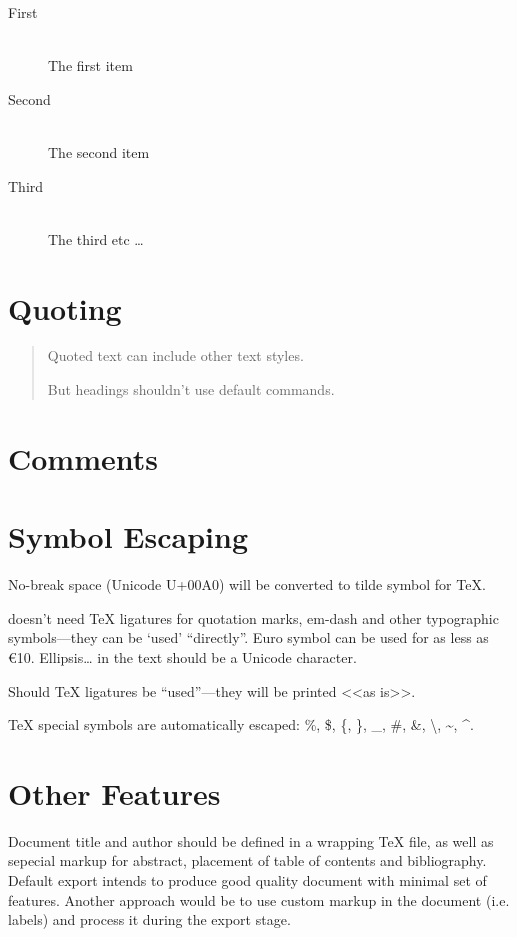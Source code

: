 \documentclass[10pt]{article}
\begin{document}
\begin{description}
  \item[First] \hfill \\
  The first item
  \item[Second] \hfill \\
  The second item
  \item[Third] \hfill \\
  The third etc \ldots
\end{description}

\section{Quoting}

\begin{quotation}

Quoted text can include other text styles.

\Large But headings shouldn’t use default commands.

\end{quotation}

\section{Comments}

\section{Symbol Escaping}

No-break space (Unicode U+00A0) will be converted to tilde symbol for TeX.

\XeTeX{} doesn't need \TeX{} ligatures for quotation marks, em-dash and other
typographic symbols—they can be ‘used’ “directly”. Euro symbol can be used for
as less as €10. Ellipsis… in the text should be a Unicode character.

Should \TeX{} ligatures be ``used''—they will be printed <<as is>>.

\TeX{} special symbols are automatically escaped: \%, \$, \{, \}, \_, \#,
\&, \textbackslash, \textasciitilde, \textasciicircum.

\section{Other Features}

Document title and author should be defined in a wrapping \TeX{} file, as well
as sepecial markup for abstract, placement of table of contents and
bibliography. Default export intends to produce good quality document with
minimal set of features. Another approach would be to use custom markup in the
document (i.e. labels) and process it during the export stage.
\end{document}
